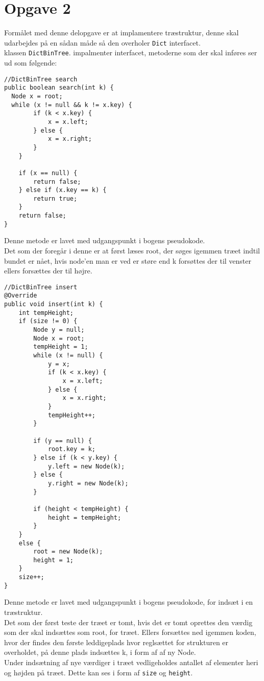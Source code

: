 \documentclass{article}
\begin{document}
\section*{Opgave 2}
Formålet med denne delopgave er at implamentere træstruktur, denne skal udarbejdes på en sådan måde så den overholer \texttt{Dict} interfacet.\\
klassen \texttt{DictBinTree}. impalmenter interfacet, metoderne som der skal inføres ser ud som følgende:
\begin{lstlisting}
//DictBinTree search
public boolean search(int k) {
  Node x = root;
  while (x != null && k != x.key) {
        if (k < x.key) {
            x = x.left;
        } else {
            x = x.right;
        }
    }

    if (x == null) {
        return false;
    } else if (x.key == k) {
        return true;
    }
    return false;
}
\end{lstlisting}
\bigskip
Denne metode er lavet med udgangspunkt i bogens pseudokode.\\
Det som der foregår i denne er at først læses root, der søges igemmen træet indtil bundet er nået, hvis node'en man er ved er støre end k forsøttes der til venster ellers forsættes der til højre.\\
\newpage
\begin{lstlisting}
//DictBinTree insert
@Override
public void insert(int k) {
	int tempHeight;
	if (size != 0) {
		Node y = null;
       	Node x = root;
		tempHeight = 1;
		while (x != null) {
			y = x;
			if (k < x.key) {
				x = x.left;
			} else {
				x = x.right;
			}
			tempHeight++;
        }
		
		if (y == null) {
			root.key = k;
		} else if (k < y.key) {
			y.left = new Node(k);
		} else {
			y.right = new Node(k);
		}
            
		if (height < tempHeight) {
			height = tempHeight;
		}
	}
	else {
		root = new Node(k);
		height = 1;
	}
	size++;
}
\end{lstlisting}
\bigskip
Denne metode er lavet med udgangspunkt i bogens pseudokode, for indsæt i en træstruktur.\\
Det som der først teste der træet er tomt, hvis det er tomt oprettes den værdig som der skal indsættes som root, for træet. Ellers forsættes ned igemmen koden, hvor der findes den første leddigeplads hvor reglsættet for strukturen er overholdet, på denne plads indsættes k, i form af af ny Node.\\
Under indsætning af nye værdiger i træet vedligeholdes antallet af elementer heri og højden på træet. Dette kan ses i form af \texttt{size} og \texttt{height}.
\end{document}

